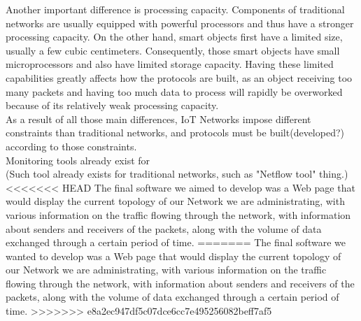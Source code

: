 Another important difference is processing capacity. Components of traditional networks are usually equipped with powerful processors and thus have a stronger processing capacity. On the other hand, smart objects first have a limited size, usually a few cubic centimeters. Consequently, those smart objects have small microprocessors and also have limited storage capacity. Having these limited capabilities greatly affects how the protocols are built, as an object receiving too many packets and having too much data to process will rapidly be overworked because of its relatively weak processing capacity. \\

As a result of all those main differences, IoT Networks impose different constraints than traditional networks, and protocols must be built(developed?) according to those constraints.\\

Monitoring tools already exist for \\

(Such tool already exists for traditional networks, such as "Netflow tool" thing.)\\

<<<<<<< HEAD
The final software we aimed to develop was a Web page that would display the current topology of our Network we are administrating, with various information on the traffic flowing through the network, with information about senders and receivers of the packets, along with the volume of data exchanged through a certain period of time. 
=======
The final software we wanted to develop was a Web page that would display the current topology of our Network we are administrating, with various information on the traffic flowing through the network, with information about senders and receivers of the packets, along with the volume of data exchanged through a certain period of time.
>>>>>>> e8a2ec947df5c07dce6cc7e495256082beff7af5
